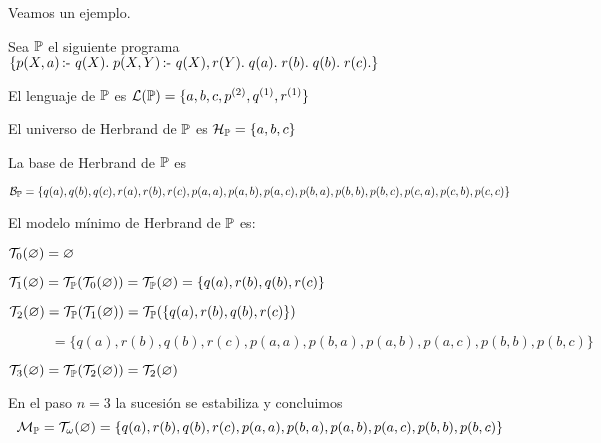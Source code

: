 \documentclass[11pt,letterpaper]{article}
\begin{document}




Veamos un ejemplo.

\beje
Sea $\P$ el siguiente programa $\{p(X,a)\impp q(X).\; p(X,Y)\impp q(X),r(Y). 
\; q(a). \; r(b). \; q(b). \; r(c). \}$
\bi
\item El lenguaje de $\P$ es $\L(\P)=\{a,b,c,p^{(2)},q^{(1)},r^{(1)}\}$
\item El universo de Herbrand de $\P$ es $\H_\P=\{a,b,c\}$
\item La base de Herbrand de $\P$ es
\begin{small}
  \[\B_\P = \{  q(a),q(b),q(c),r(a),r(b),r(c),
               p(a,a),p(a,b),p(a,c), p(b,a),p(b,b),p(b,c), 
                p(c,a),p(c,b),p(c,c) \}\]
\end{small}
\item El modelo m\'inimo de Herbrand de $\P$ es:
\bi
\item $\T_0(\vacio)= \vacio$
\item $\T_1(\vacio)=
  \T_\P(\T_0(\vacio))=\T_\P(\vacio)=\{q(a),r(b),q(b),r(c)\}$
\item
  $\T_2(\vacio)=\T_\P(\T_1(\vacio))=\T_\P(\{q(a),r(b),q(b),r(c)\})$
\item[] 
$\;\;\;\;\;\;\;\;\;\;\;=\{q(a),r(b),q(b),r(c),p(a,a),p(b,a),p(a,b),p(a,c),p(b,b)
,p(b,c)\}$
\item $\T_3(\vacio)=\T_\P(\T_2(\vacio))=\T_2(\vacio)$
\ei
\item En el paso $n=3$ la sucesi\'on se estabiliza y concluimos 
\[
\M_\P=\T_\omega(\vacio)=\{q(a),r(b),q(b),r(c),p(a,a),p(b,a),p(a,b),p(a,c),p(b,b)
,p(b,c)\}
\]
\ei
\eeje
\end{document}
